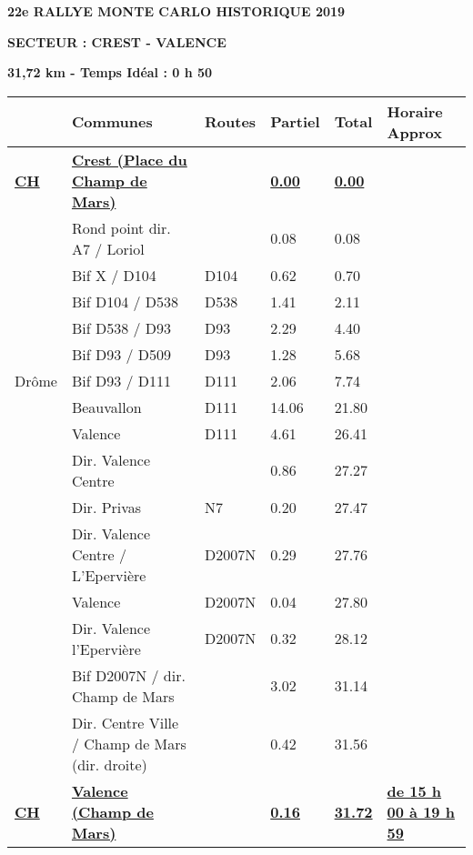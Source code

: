 \documentclass{article}%
\begin{document}
%
\normalsize%
\begin{center} \textbf{\LARGE{22e RALLYE MONTE CARLO HISTORIQUE 2019}} \end{center}%
\begin{flushleft} \textbf{SECTEUR : CREST - VALENCE
} \end{flushleft}%
\begin{flushright} \textbf{31,72 km - Temps Idéal : 0 h 50
} \end{flushright}%
\begin{longtable}{p{2.25cm}|p{6.7cm}|p{2.0cm}|p{1.5cm}|p{1.5cm}|p{3.5cm}}%
\hline%
&Communes&Routes&Partiel&Total&Horaire Approx\\%
\hline%
\endhead%
\endfoot%
\endlastfoot%
\textbf{\underline{﻿CH}}&\textbf{\underline{Crest (Place du Champ de Mars)}}& &\textbf{\underline{0.00}}&\textbf{\underline{0.00}}& \\%
 &Rond point dir. A7 / Loriol& &0.08&0.08& \\%
 &Bif X / D104&D104&0.62&0.70& \\%
 &Bif D104 / D538&D538&1.41&2.11& \\%
 &Bif D538 / D93&D93&2.29&4.40& \\%
 &Bif D93 / D509&D93&1.28&5.68& \\%
Drôme&Bif D93 / D111&D111&2.06&7.74& \\%
 &Beauvallon&D111&14.06&21.80& \\%
 &Valence&D111&4.61&26.41& \\%
 &Dir. Valence Centre& &0.86&27.27& \\%
 &Dir. Privas&N7&0.20&27.47& \\%
 &Dir. Valence Centre / L'Epervière&D2007N&0.29&27.76& \\%
 &Valence&D2007N&0.04&27.80& \\%
 &Dir. Valence l'Epervière&D2007N&0.32&28.12& \\%
 &Bif D2007N / dir. Champ de Mars& &3.02&31.14& \\%
 &Dir. Centre Ville / Champ de Mars (dir. droite)& &0.42&31.56& \\%
\textbf{\underline{CH}}&\textbf{\underline{Valence (Champ de Mars)}}& &\textbf{\underline{0.16}}&\textbf{\underline{31.72}}&\textbf{\underline{de 15 h 00 à 19 h 59}}\\%
\hline%
\end{longtable}%
\begin{flushleft} \textit{} \end{flushleft}%
\begin{center} \textit{\textbf{}} \end{center}%
\begin{center} \textit{} \end{center}%
\begin{center} \textit{} \end{center}%
\end{document}
